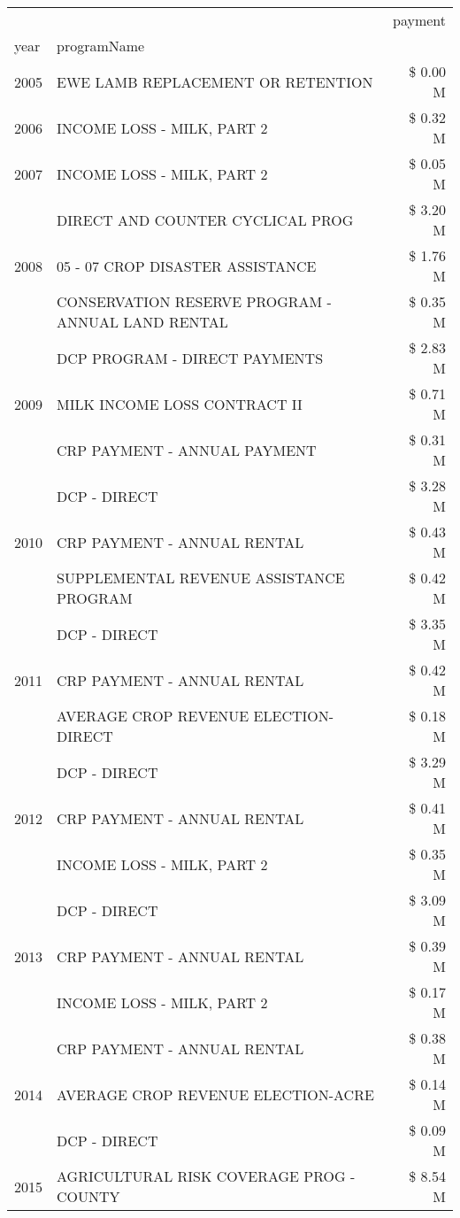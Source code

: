 \begin{tabular}{llr}
\toprule
 &  & payment \\
year & programName &  \\
\midrule
2005 & EWE LAMB REPLACEMENT OR RETENTION & \$ 0.00 M \\
\cline{1-3}
2006 & INCOME LOSS - MILK, PART 2 & \$ 0.32 M \\
\cline{1-3}
2007 & INCOME LOSS - MILK, PART 2 & \$ 0.05 M \\
\cline{1-3}
\multirow[t]{3}{*}{2008} & DIRECT AND COUNTER CYCLICAL PROG & \$ 3.20 M \\
 & 05 - 07 CROP DISASTER ASSISTANCE & \$ 1.76 M \\
 & CONSERVATION RESERVE PROGRAM - ANNUAL LAND RENTAL & \$ 0.35 M \\
\cline{1-3}
\multirow[t]{3}{*}{2009} & DCP PROGRAM - DIRECT PAYMENTS & \$ 2.83 M \\
 & MILK INCOME LOSS CONTRACT II & \$ 0.71 M \\
 & CRP PAYMENT - ANNUAL PAYMENT & \$ 0.31 M \\
\cline{1-3}
\multirow[t]{3}{*}{2010} & DCP - DIRECT & \$ 3.28 M \\
 & CRP PAYMENT - ANNUAL RENTAL & \$ 0.43 M \\
 & SUPPLEMENTAL REVENUE ASSISTANCE PROGRAM & \$ 0.42 M \\
\cline{1-3}
\multirow[t]{3}{*}{2011} & DCP - DIRECT & \$ 3.35 M \\
 & CRP PAYMENT - ANNUAL RENTAL & \$ 0.42 M \\
 & AVERAGE CROP REVENUE ELECTION-DIRECT & \$ 0.18 M \\
\cline{1-3}
\multirow[t]{3}{*}{2012} & DCP - DIRECT & \$ 3.29 M \\
 & CRP PAYMENT - ANNUAL RENTAL & \$ 0.41 M \\
 & INCOME LOSS - MILK, PART 2 & \$ 0.35 M \\
\cline{1-3}
\multirow[t]{3}{*}{2013} & DCP - DIRECT & \$ 3.09 M \\
 & CRP PAYMENT - ANNUAL RENTAL & \$ 0.39 M \\
 & INCOME LOSS - MILK, PART 2 & \$ 0.17 M \\
\cline{1-3}
\multirow[t]{3}{*}{2014} & CRP PAYMENT - ANNUAL RENTAL & \$ 0.38 M \\
 & AVERAGE CROP REVENUE ELECTION-ACRE & \$ 0.14 M \\
 & DCP - DIRECT & \$ 0.09 M \\
\cline{1-3}
\multirow[t]{3}{*}{2015} & AGRICULTURAL RISK COVERAGE PROG - COUNTY & \$ 8.54 M \\

\end{tabular}
